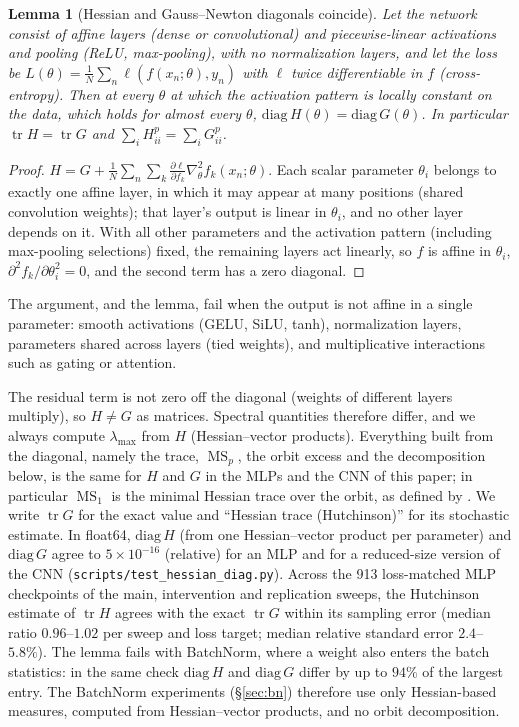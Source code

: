 \documentclass[10pt]{article}
\newtheorem{lemma}{Lemma}
\theoremstyle{remark}
\newcommand{\tr}{\operatorname{tr}}
\newcommand{\MS}{\operatorname{MS}}
\begin{document}
\begin{lemma}[Hessian and Gauss--Newton diagonals coincide]\label{lem:diag}
Let the network consist of affine layers (dense or convolutional) and piecewise-linear activations and pooling (ReLU, max-pooling), with no normalization layers, and let the loss be $L(\theta)=\frac1N\sum_n\ell(f(x_n;\theta),y_n)$ with $\ell$ twice differentiable in $f$ (cross-entropy). Then at every $\theta$ at which the activation pattern is locally constant on the data, which holds for almost every $\theta$, $\mathrm{diag}\,H(\theta)=\mathrm{diag}\,G(\theta)$. In particular $\tr H=\tr G$ and $\sum_iH_{ii}^p=\sum_iG_{ii}^p$.
\end{lemma}
\begin{proof}
$H=G+\frac1N\sum_n\sum_k\frac{\partial\ell}{\partial f_k}\nabla^2_\theta f_k(x_n;\theta)$. Each scalar parameter $\theta_i$ belongs to exactly one affine layer, in which it may appear at many positions (shared convolution weights); that layer's output is linear in $\theta_i$, and no other layer depends on it. With all other parameters and the activation pattern (including max-pooling selections) fixed, the remaining layers act linearly, so $f$ is affine in $\theta_i$, $\partial^2f_k/\partial\theta_i^2=0$, and the second term has a zero diagonal.
\end{proof}
The argument, and the lemma, fail when the output is not affine in a single parameter: smooth activations (GELU, SiLU, tanh), normalization layers, parameters shared across layers (tied weights), and multiplicative interactions such as gating or attention.

The residual term is not zero off the diagonal (weights of different layers multiply), so $H\ne G$ as matrices. Spectral quantities therefore differ, and we always compute $\lambda_{\max}$ from $H$ (Hessian--vector products). Everything built from the diagonal, namely the trace, $\MS_p$, the orbit excess and the decomposition below, is the same for $H$ and $G$ in the MLPs and the CNN of this paper; in particular $\MS_1$ is the minimal Hessian trace over the orbit, as defined by \citet{ibayashi2021minimum}. We write $\tr G$ for the exact value and ``Hessian trace (Hutchinson)'' for its stochastic estimate. In float64, $\mathrm{diag}\,H$ (from one Hessian--vector product per parameter) and $\mathrm{diag}\,G$ agree to $5\times10^{-16}$ (relative) for an MLP and for a reduced-size version of the CNN (\texttt{scripts/test\_hessian\_diag.py}). Across the 913 loss-matched MLP checkpoints of the main, intervention and replication sweeps, the Hutchinson estimate of $\tr H$ agrees with the exact $\tr G$ within its sampling error (median ratio $0.96$--$1.02$ per sweep and loss target; median relative standard error $2.4$--$5.8\%$). The lemma fails with BatchNorm, where a weight also enters the batch statistics: in the same check $\mathrm{diag}\,H$ and $\mathrm{diag}\,G$ differ by up to $94\%$ of the largest entry. The BatchNorm experiments (\S\ref{sec:bn}) therefore use only Hessian-based measures, computed from Hessian--vector products, and no orbit decomposition.
\end{document}
